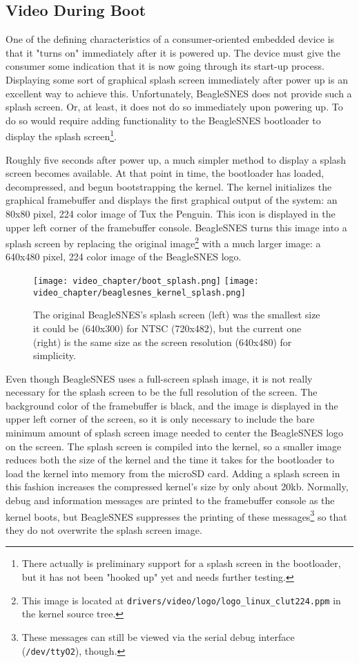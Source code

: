 \subsection{Video During Boot}

One of the defining characteristics of a consumer-oriented embedded device is that it "turns on" immediately after it is powered up.  The device must give the consumer some indication that it is now going through its start-up process.  Displaying some sort of graphical splash screen immediately after power up is an excellent way to achieve this.  Unfortunately, BeagleSNES does not provide such a splash screen.  Or, at least, it does not do so immediately upon powering up.  To do so would require adding functionality to the BeagleSNES bootloader to display the splash screen\footnote{There actually is preliminary support for a splash screen in the bootloader, but it has not been "hooked up" yet and needs further testing.}. 

Roughly five seconds after power up, a much simpler method to display a splash screen becomes available.  At that point in time, the bootloader has loaded, decompressed, and begun bootstrapping the kernel.  The kernel initializes the graphical framebuffer and displays the first graphical output of the system: an 80x80 pixel, 224 color image of Tux the Penguin.  This icon is displayed in the upper left corner of the framebuffer console.  BeagleSNES turns this image into a splash screen by replacing the original image\footnote{This image is located at \texttt{drivers/video/logo/logo\_linux\_clut224.ppm} in the kernel source tree.} with a much larger image: a 640x480 pixel, 224 color image of the BeagleSNES logo.

\begin{figure}[h]
\centering\texttt{[image: video\_chapter/boot\_splash.png]} \texttt{[image: video\_chapter/beaglesnes\_kernel\_splash.png]}
\caption{The original BeagleSNES's splash screen (left) was the smallest size it could be (640x300) for NTSC (720x482), but the current one (right) is the same size as the screen resolution (640x480) for simplicity.}
\end{figure}

Even though BeagleSNES uses a full-screen splash image, it is not really necessary for the splash screen to be the full resolution of the screen.  The background color of the framebuffer is black, and the image is displayed in the upper left corner of the screen, so it is only necessary to include the bare minimum amount of splash screen image needed to center the BeagleSNES logo on the screen.  The splash screen is compiled into the kernel, so a smaller image reduces both the size of the kernel and the time it takes for the bootloader to load the kernel into memory from the microSD card.  Adding a splash screen in this fashion increases the compressed kernel's size by only about 20kb.  Normally, debug and information messages are printed to the framebuffer console as the kernel boots, but BeagleSNES suppresses the printing of these messages\footnote{These messages can still be viewed via the serial debug interface (\texttt{/dev/ttyO2}), though.} so that they do not overwrite the splash screen image.

